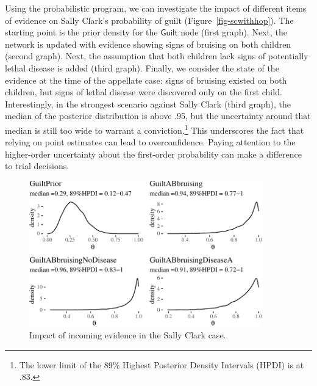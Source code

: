 \documentclass[
  letterpaper,
  DIV=11,
  numbers=noendperiod]{scrartcl}
\newcommand{\s}[1]{\mbox{$\mathsf{#1}$}}
\begin{document}
Using the probabilistic program, we can investigate the impact of
different items of evidence on Sally Clark's probability of guilt
(Figure~\ref{fig-scwithhop}). The starting point is the prior density
for the \s{Guilt} node (first graph). Next, the network is updated with
evidence showing signs of bruising on both children (second graph).
Next, the assumption that both children lack signs of potentially lethal
disease is added (third graph). Finally, we consider the state of the
evidence at the time of the appellate case: signs of bruising existed on
both children, but signs of lethal disease were discovered only on the
first child. Interestingly, in the strongest scenario against Sally
Clark (third graph), the median of the posterior distribution is above
.95, but the uncertainty around that median is still too wide to warrant
a conviction.\footnote{The lower limit of the 89\% Highest Posterior
  Density Intervals (HPDI) is at .83.} This underscores the fact that
relying on point estimates can lead to overconfidence. Paying attention
to the higher-order uncertainty about the first-order probability can
make a difference to trial decisions.


\begin{figure}[H]

{\centering \includegraphics[width=0.9\textwidth,height=\textheight]{imp_philosophical_backup_files/figure-pdf/fig-scwithhop2-1.pdf}

}

\caption{\label{fig-scwithhop2}Impact of incoming evidence in the Sally
Clark case.}

\end{figure}
\end{document}
